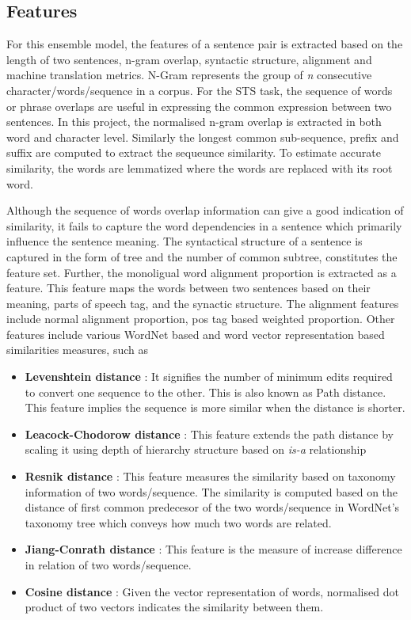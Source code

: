 \documentclass[12pt]{report} %
\begin{document}
	\subsection{Features}
	For this ensemble model, the features of a sentence pair is extracted based on the length of two sentences, n-gram overlap, syntactic structure, alignment and machine translation metrics. N-Gram represents the group of \textit{n} consecutive character/words/sequence in a corpus. For the STS task, the  sequence of words or phrase overlaps are useful in expressing the common expression between two sentences. In this project, the normalised n-gram overlap is extracted in both word and character level. Similarly the longest common sub-sequence, prefix and suffix are computed to extract the sequeunce similarity. To estimate accurate similarity, the words are lemmatized where the words are replaced with its root word. 
	
	Although the sequence of words overlap information can give a good indication of similarity, it fails to capture the word dependencies in a sentence which primarily influence the sentence meaning. The syntactical structure of a sentence is captured in the form of tree and the number of common subtree, constitutes the feature set. Further, the monoligual word alignment proportion is extracted as a feature. This feature maps the words between two sentences based on their meaning, parts of speech tag, and the synactic structure. The alignment features include normal alignment proportion, pos tag based weighted proportion. Other features include various WordNet based and word vector representation based similarities measures, such as
	
	\begin{itemize}
		\item \textbf{Levenshtein distance} : It signifies the number of minimum edits required to convert one sequence to the other. This is also known as Path distance. This feature  implies the sequence is more similar when the distance is shorter. 
		\item\textbf{Leacock-Chodorow distance} : This feature extends the path distance by scaling it using depth of hierarchy structure based on \textit{is-a } relationship
		\item \textbf{Resnik distance} : This feature measures the similarity based on taxonomy information of two words/sequence. The similarity is computed based on the distance of first common predecesor of the two words/sequence in WordNet's taxonomy tree which conveys how much two words are related.
		
		\item \textbf{Jiang-Conrath distance} : This feature is the measure of increase difference in relation of two words/sequence.  
		\item \textbf{Cosine distance} : Given the vector representation of words, normalised dot product of two vectors indicates the similarity between them.
	\end{itemize}
	
\end{document}
